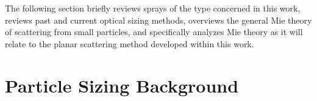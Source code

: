 The following section briefly reviews sprays of the type concerned in this work, reviews past and current optical sizing methods, overviews the general Mie theory of scattering from small particles, and specifically analyzes Mie theory as it will relate to the planar scattering method developed within this work.

\section{Particle Sizing Background}
\label{background}

%

%

%

